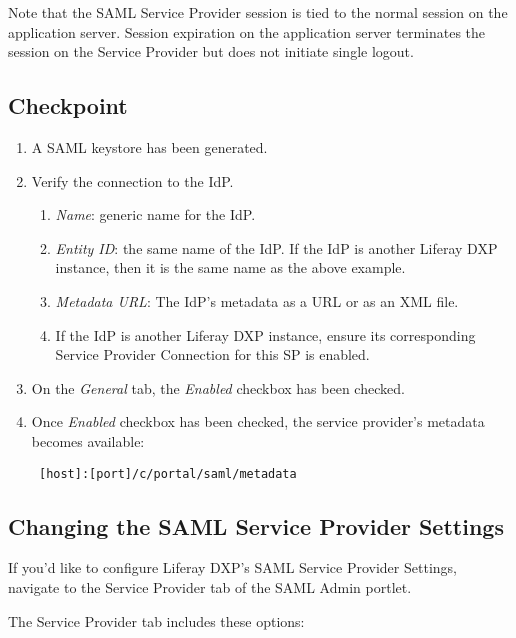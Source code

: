 Note that the SAML Service Provider session is tied to the normal
session on the application server. Session expiration on the application
server terminates the session on the Service Provider but does not
initiate single logout.

\subsection{Checkpoint}\label{checkpoint-2}

\begin{enumerate}
\def\labelenumi{\arabic{enumi}.}
\item
  A SAML keystore has been generated.
\item
  Verify the connection to the IdP.

  \begin{enumerate}
  \def\labelenumii{\alph{enumii}.}
  \item
    \emph{Name}: generic name for the IdP.
  \item
    \emph{Entity ID}: the same name of the IdP. If the IdP is another
    Liferay DXP instance, then it is the same name as the above example.
  \item
    \emph{Metadata URL}: The IdP's metadata as a URL or as an XML file.
  \item
    If the IdP is another Liferay DXP instance, ensure its corresponding
    Service Provider Connection for this SP is enabled.
  \end{enumerate}
\item
  On the \emph{General} tab, the \emph{Enabled} checkbox has been
  checked.
\item
  Once \emph{Enabled} checkbox has been checked, the service provider's
  metadata becomes available:

\begin{verbatim}
 [host]:[port]/c/portal/saml/metadata
\end{verbatim}
\end{enumerate}

\subsection{Changing the SAML Service Provider
Settings}\label{changing-the-saml-service-provider-settings}

If you'd like to configure Liferay DXP's SAML Service Provider Settings,
navigate to the Service Provider tab of the SAML Admin portlet.

The Service Provider tab includes these options:

